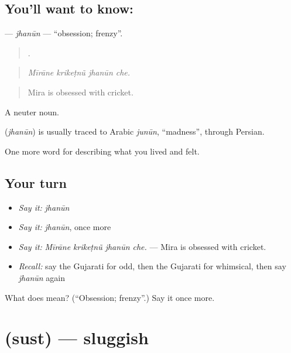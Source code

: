 \subsection*{You'll want to know: }
\textbf{} — \emph{jhanūn} — \textquotedblleft{}obsession; frenzy\textquotedblright{}.

\begin{quote}
   .
\end{quote}

\begin{quote}
\emph{Mīrāne krikeṭnũ jhanūn che.}
\end{quote}

\begin{quote}
Mira is obsessed with cricket.
\end{quote}

A neuter noun.

\begin{cousinweb}
\textbf{} (\emph{jhanūn}) is usually traced to Arabic \emph{junūn}, \textquotedblleft{}madness\textquotedblright{}, through Persian.
\end{cousinweb}

\begin{grammarlens}[title={What you've built}]
One more word for describing what you lived and felt.
\end{grammarlens}

\subsection*{Your turn}
\begin{itemize}
\raggedright
  \item \emph{Say it:} \emph{jhanūn}
  \item \emph{Say it:} \emph{jhanūn}, once more
  \item \emph{Say it:} \emph{Mīrāne krikeṭnũ jhanūn che.} — Mira is obsessed with cricket.
  \item \emph{Recall:} say the Gujarati for odd, then the Gujarati for whimsical, then say \emph{jhanūn} again
\end{itemize}

\begin{tcolorbox}[breakable,colback=teal!4,colframe=teal!35!black,title={Before you move on}]
What does  mean? (\textquotedblleft{}Obsession; frenzy\textquotedblright{}.) Say it once more.
\end{tcolorbox}
\section[\texorpdfstring{\gu{સુસ્ત} (sust)}{સુસ્ત (sust)}]{ (sust) — sluggish}

